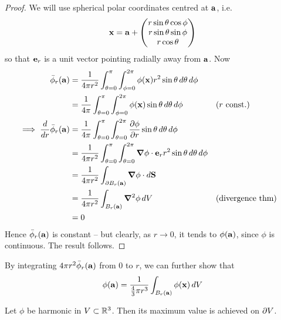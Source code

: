 \documentclass{../../template/note}
\begin{document}
    \begin{proof}
        We will use spherical polar coordinates centred at \(\V a\), i.e.
        \begin{align*}
            \V x = \V a + \begin{pmatrix}
             r\sin\theta\cos\phi \\
             r\sin\theta\sin\phi \\
             r\cos\theta \\
            \end{pmatrix}
        \end{align*}
        so that \(\V e_r\) is a unit vector pointing radially away from \(\V a\). Now
        \begin{align*}
            \bar\phi_r(\V a) &= \frac 1 {4\pi r^2} \int_{\theta=0}^\pi \int_{\phi=0}^{2\pi} \phi(\V x) r^2 \sin \theta \D \theta \D \phi \\
            &= \frac 1 {4\pi} \int_{\theta=0}^\pi \int_{\phi=0}^{2\pi} \phi(\V x) \sin \theta \D \theta \D \phi && (r \text{ const.}) \\
            \implies \frac{d}{dr} \bar\phi_r(\V a) &= \frac 1 {4\pi} \int_{\theta=0}^\pi \int_{\theta=0}^{2\pi} \pd{\phi}{r} \sin \theta \D\theta\D\phi \\
            &= \frac 1 {4\pi r^2} \int_{\theta=0}^\pi \int_{\theta=0}^{2\pi} \grad \phi \cdot \V e_r r^2 \sin \theta \D\theta\D\phi \\
            &= \frac 1 {4\pi r^2} \int_{\pr B_r(\V a)} \grad \phi \cdot d\V S \\
            &= \frac 1 {4\pi r^2} \int_{B_r(\V a)} \grad^2 \phi \D V && \text{(divergence thm)} \\
            &= 0
        \end{align*}
        Hence \(\bar\phi_r(\V a)\) is constant -- but clearly, as \(r \to 0\), it tends to \(\phi(\V a)\), since \(\phi\) is continuous. The result follows.
    \end{proof}
    
    \begin{remark*}
        By integrating \(4 \pi r^2 \bar\phi_r(\V a)\) from 0 to \(r\), we can further show that
        \begin{align*}
            \phi(\V a) = \frac 1 {\frac 4 3 \pi r^3} \int_{B_r(\V a)} \phi(\V x) \D V
        \end{align*}
    \end{remark*}

    \begin{proposition*}
        Let \(\phi\) be harmonic in \(V \subset \mathbb R^3\). Then its maximum value is achieved on \(\partial V\).
    \end{proposition*}
    
\end{document}
